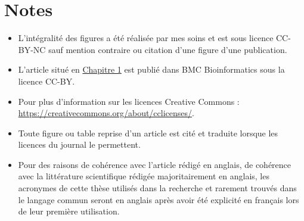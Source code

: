 \section{Notes}

\begin{itemize}
    \item L'intégralité des figures a été réalisée par mes soins et est sous licence CC-BY-NC sauf mention contraire ou citation d'une figure d'une publication.
    \item L'article situé en \hyperref[chapter:gwena]{Chapitre 1} est publié dans BMC Bioinformatics sous la licence CC-BY.
    \item Pour plus d'information sur les licences Creative Commons : \url{https://creativecommons.org/about/cclicenses/}.
    \item Toute figure ou table reprise d'un article est cité et traduite lorsque les licences du journal le permettent.
    \item Pour des raisons de cohérence avec l'article rédigé en anglais, de cohérence avec la littérature scientifique rédigée majoritairement en anglais, les acronymes de cette thèse utilisés dans la recherche et rarement trouvés dans le langage commun seront en anglais après avoir été explicité en français lors de leur première utilisation.
\end{itemize}